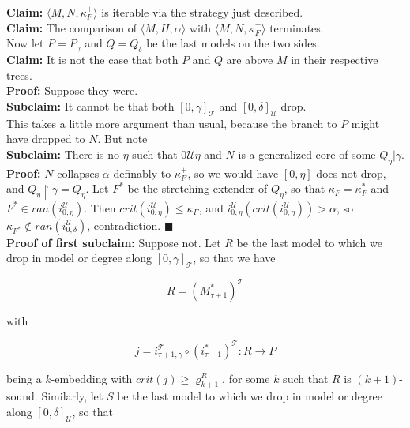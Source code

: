 \documentclass[12pt]{article}
\begin{document}
\textbf{Claim:} $\langle M, N , \kappa_F^+ \rangle$ is iterable via the strategy just described.\\

\textbf{Claim:}  The comparison of $\langle M, H , \alpha \rangle$ with $\langle M, N , \kappa_F^+ \rangle$ terminates.\\

Now let $P = P_\gamma$ and $Q = Q_\delta$ be the last models on the two sides.\\

\textbf{Claim:}  It is not the case that both $P$ and $Q$ are above $M$ in their respective trees.\\

\textbf{Proof:}  Suppose they were.\\

\textbf{Subclaim:}  It cannot be that both $[ 0 , \gamma]_{\mathscr{T}}$ and $[ 0 , \delta ]_{\mathscr{U}}$ drop.\\

This takes a little more argument than usual, because the branch to $P$ might have dropped to $N$.  But note\\

\textbf{Subclaim:} There is no $\eta$ such that $0 \mathscr{U} \eta$ and $N$ is a generalized core of some $Q_\eta | \gamma$.\\

\textbf{Proof:} $N$ collapses $\alpha$ definably to $\kappa_F^+$, so we would have $[ 0 , \eta ]$ does not drop, and $Q_\eta \restriction \gamma = Q_\eta$.  Let $F^*$ be the stretching extender of $Q_\eta$, so that $\kappa_F = \kappa_F^*$ and $F^* \in ran (i_{0, \eta}^{\mathscr{U}})$.  Then $crit(i_{0, \eta}^{\mathscr{U}}) \leq \kappa_F$, and $i_{0, \eta}^{\mathscr{U}} (crit (i_{0, \eta}^{\mathscr{U}})) > \alpha$, so $\kappa_{F^*} \notin ran (i_{0, \delta}^{\mathscr{U}})$, contradiction. $\blacksquare$\\

\textbf{Proof of first subclaim:} Suppose not.  Let $R$ be the last model to which we drop in model or degree along $[ 0 , \gamma ]_{\mathscr{T}}$, so that we have

\[
R = (M_{\tau + 1}^*)^{\mathscr{T}}
\]

with

\[
j = i_{\tau + 1 , \gamma }^{\mathscr{T}} \circ (i_{\tau + 1}^*)^{\mathscr{T}} : R \longrightarrow P
\]

being a $k$-embedding with $crit(j) \geq \varrho_{k+1}^R$, for some $k$ such that $R$ is $(k+1)$-sound.  Similarly, let $S$ be the last model to which we drop in model or degree along $[0 , \delta ]_{\mathscr{U}}$, so that
\end{document}
